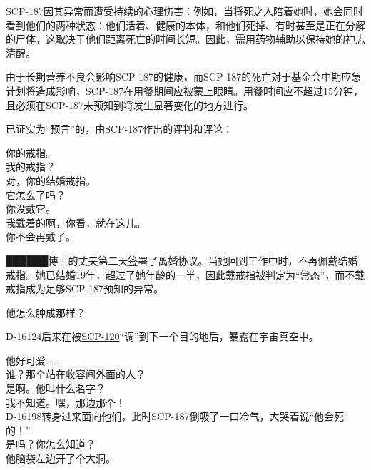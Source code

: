 SCP-187因其异常而遭受持续的心理伤害：例如，当将死之人陪着她时，她会同时看到他们的两种状态：他们活着、健康的本体，和他们死掉、有时甚至是正在分解的尸体，这取决于他们距离死亡的时间长短。因此，需用药物辅助以保持她的神志清醒。


由于长期营养不良会影响SCP-187的健康，而SCP-187的死亡对于基金会中期应急计划将造成影响，SCP-187在用餐期间应被蒙上眼睛。用餐时间应不超过15分钟，且必须在SCP-187未预知到将发生显著变化的地方进行。

\hr

已证实为“预言”的，由SCP-187作出的评判和评论：


\begin{scpbox}

你的戒指。\\
我的戒指？\\
对，你的结婚戒指。\\
它怎么了吗？\\
你没戴它。\\
我戴着的啊，你看，就在这儿。\\
你不会再戴了。

\end{scpbox}

██████博士的丈夫第二天签署了离婚协议。当她回到工作中时，不再佩戴结婚戒指。她已结婚19年，超过了她年龄的一半，因此戴戒指被判定为“常态”，而不戴戒指成为足够SCP-187预知的异常。

\hr



\begin{scpbox}

他怎么肿成那样？

\end{scpbox}

D-16124后来在被\hyperref[chap:SCP-120]{SCP-120}“调”到下一个目的地后，暴露在宇宙真空中。


\begin{scpbox}

他好可爱……\\
谁？那个站在收容间外面的人？\\
是啊。他叫什么名字？\\
我不知道。嘿，那边那个！\\
D-16198转身过来面向他们，此时SCP-187倒吸了一口冷气，大哭着说“他会死的！”\\
是吗？你怎么知道？\\
他脑袋左边开了个大洞。

\end{scpbox}

